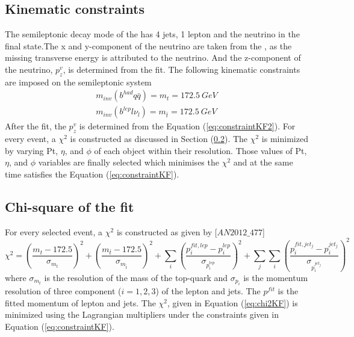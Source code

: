\subsection{Kinematic constraints}
\label{ss:constraintKF} 
The semileptonic decay mode of the \ttbar has 4 jets, 1 lepton and the neutrino in the final
state.The x and y-component of the neutrino are taken from the \MET, as the 
missing transverse energy is attributed to the neutrino. And the z-component of the 
neutrino, $p^v_z$, is determined from the fit. The following kinematic constraints are 
imposed on the semileptonic \ttbar system
\begin{subequations}
\begin{eqnarray}
	m_{inv}(b^{had}q\bar{q}) = m_{t} = 172.5 ~GeV \label{eq:constraintKF1}\\
	m_{inv}(b^{lep}l\nu_l)   = m_{\bar{t}} = 172.5 ~GeV \label{eq:constraintKF2}
\end{eqnarray}
\label{eq:constraintKF}
\end{subequations}
After the fit, the $p^v_z$ is determined from the Equation (\ref{eq:constraintKF2}). 
For every event, a $\chi^2$ is constructed as discussed in Section (\ref{ss:chi2KF}).
The $\chi^2$ is minimized by varying Pt, $\eta$, and $\phi$ of each object within
their resolution. Those values of Pt, $\eta$, and $\phi$ variables are finally selected 
which minimises the $\chi^2$ and at the same time satisfies the Equation (\ref{eq:constraintKF}).

\subsection{Chi-square of the fit}
\label{ss:chi2KF} 
For every selected event, a $\chi^2$ is constructed as given by [$AN2012\_477$]
\begin{equation}
	\chi^2 = \left(\frac{m_t - 172.5}{\sigma_{m_{t}}}\right)^2 + 
	\left(\frac{m_{\bar{t}} - 172.5}{\sigma_{m_{\bar{t}}}}\right)^2+
	\sum_{i}\left(\frac{p_i^{fit, lep} - p_i^{lep}}{\sigma_{p^{lep}_i}}\right)^2+
	\sum_{j}\sum_{i}\left(\frac{p_i^{fit, jet_j} - 
	p_i^{jet_j}}{\sigma_{p^{jet_j}_i}}\right)^2
\label{eq:chi2KF}
\end{equation}
where $\sigma_{m_{t}}$ is the resolution of the mass of the top-quark and $\sigma_{p_{i}}$ 
is the momentum resolution of three component ($i= 1, 2, 3$) of the lepton and jets.
The $p^{fit}$ is the fitted momentum of lepton and jets. The $\chi^2$, given in Equation
(\ref{eq:chi2KF}) is minimized using the Lagrangian multipliers under the constraints 
given in Equation (\ref{eq:constraintKF}).

